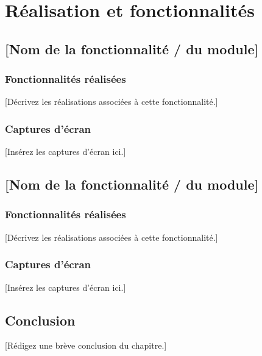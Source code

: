 \chapter{Réalisation et fonctionnalités}

\minitoc


\section{[Nom de la fonctionnalité / du module]}

\subsection{Fonctionnalités réalisées}
[Décrivez les réalisations associées à cette fonctionnalité.]

\subsection{Captures d'écran}
[Insérez les captures d'écran ici.]

\section{[Nom de la fonctionnalité / du module]}

\subsection{Fonctionnalités réalisées}
[Décrivez les réalisations associées à cette fonctionnalité.]

\subsection{Captures d'écran}
[Insérez les captures d'écran ici.]

\section{Conclusion}
[Rédigez une brève conclusion du chapitre.]

